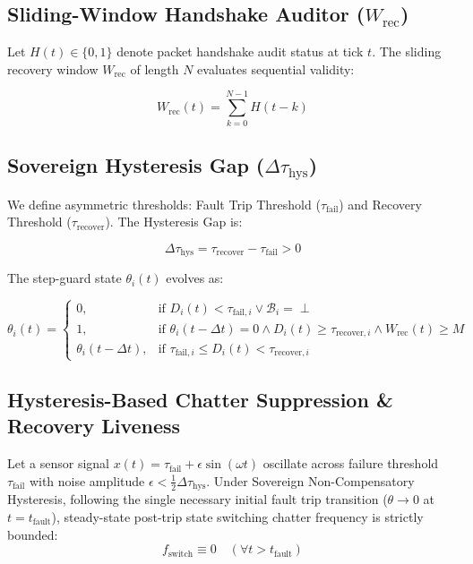 \documentclass[conference]{IEEEtran}
\begin{document}
\subsection{Sliding-Window Handshake Auditor ($W_{\text{rec}}$)}
Let $H(t) \in \{0, 1\}$ denote packet handshake audit status at tick $t$. The sliding recovery window $W_{\text{rec}}$ of length $N$ evaluates sequential validity:

\begin{equation}
W_{\text{rec}}(t) = \sum_{k=0}^{N-1} H(t - k)
\end{equation}

\subsection{Sovereign Hysteresis Gap ($\Delta \tau_{\text{hys}}$)}
We define asymmetric thresholds: Fault Trip Threshold ($\tau_{\text{fail}}$) and Recovery Threshold ($\tau_{\text{recover}}$). The Hysteresis Gap is:

\begin{equation}
\Delta \tau_{\text{hys}} = \tau_{\text{recover}} - \tau_{\text{fail}} > 0
\end{equation}

The step-guard state $\theta_i(t)$ evolves as:

\begin{equation}
\theta_i(t) = \begin{cases} 0, & \text{if } D_i(t) < \tau_{\text{fail}, i} \lor \mathcal{B}_i = \perp \\[4pt] 1, & \text{if } \theta_i(t - \Delta t) = 0 \land D_i(t) \ge \tau_{\text{recover}, i} \land W_{\text{rec}}(t) \ge M \\[4pt] \theta_i(t - \Delta t), & \text{if } \tau_{\text{fail}, i} \le D_i(t) < \tau_{\text{recover}, i} \end{cases}
\end{equation}

\subsection{Hysteresis-Based Chatter Suppression \& Recovery Liveness}

\begin{theorem}
Let a sensor signal $x(t) = \tau_{\text{fail}} + \epsilon \sin(\omega t)$ oscillate across failure threshold $\tau_{\text{fail}}$ with noise amplitude $\epsilon < \frac{1}{2}\Delta \tau_{\text{hys}}$. Under Sovereign Non-Compensatory Hysteresis, following the single necessary initial fault trip transition ($\theta \to 0$ at $t = t_{\text{fault}}$), steady-state post-trip state switching chatter frequency is strictly bounded:
\begin{equation}
f_{\text{switch}} \equiv 0 \quad (\forall t > t_{\text{fault}})
\end{equation}
\end{theorem}
\end{document}
